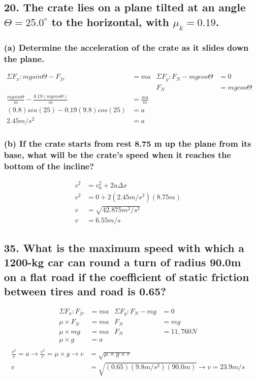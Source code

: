 \documentclass[12pt,a4paper,english]{article}
\newcommand{\degree}[1]{${#1}^\circ$}
\begin{document}
\begin{flushleft}
  \subsection{20. The crate lies on a plane tilted at an angle $\Theta=$\degree{25.0} to the horizontal, with $\mu_k=0.19$.}
  \subsubsection{(a) Determine the acceleration of the crate as it slides down the plane.}
  \begin{align*}
    \Sigma F_x: mgsin\Theta-F_{fr}&=ma
      &\Sigma F_y: F_N-mgcos\Theta&=0
      \\
    &&F_N&=mgcos\Theta
      \\
    \frac{mgsin\Theta}{m}-\frac{0.19(mgcos\Theta)}{m}&=\frac{ma}{m}
    \\
    (9.8)sin(25)-0.19(9.8)cos(25)&=a
    \\
                                 2.45m/s^2&=a
  \end{align*}
  \subsubsection{(b) If the crate starts from rest 8.75 m up the plane from its base, what will be the crate's speed when it reaches the bottom of the incline?}
  \begin{align*}
    v^2&=v_0^2+2a\Delta x
    \\
    v^2&=0+2(2.45m/s^2)(8.75m)
    \\
    v&=\sqrt{42.875m^2/s^2}
    \\
    v&=6.55m/s
  \end{align*}
  \subsection{35. What is the maximum speed with which a 1200-kg car can round a turn of radius 90.0m on a flat road if the coefficient of static friction between tires and road is 0.65? }
  \begin{align*}
    \Sigma F_x: F_{fr}&=ma
      &\Sigma F_y: F_N-mg&=0
      \\
    \mu\times F_N&=ma
                 &F_N&=mg
                 \\
    \mu\times mg&=ma
                &F_N&=11,760N
                \\
    \mu\times g&=a
    \\
  \end{align*}
  \begin{align*}
    \frac{v^2}{r}=a \rightarrow 
    \frac{v^2}{r}=\mu\times g \rightarrow
    v&=\sqrt{\mu\times g \times r}
    \\
    v&=\sqrt{(0.65)(9.8m/s^2)(90.0m)}
    \rightarrow
    v=23.9m/s
  \end{align*}

\end{flushleft}
\end{document}
